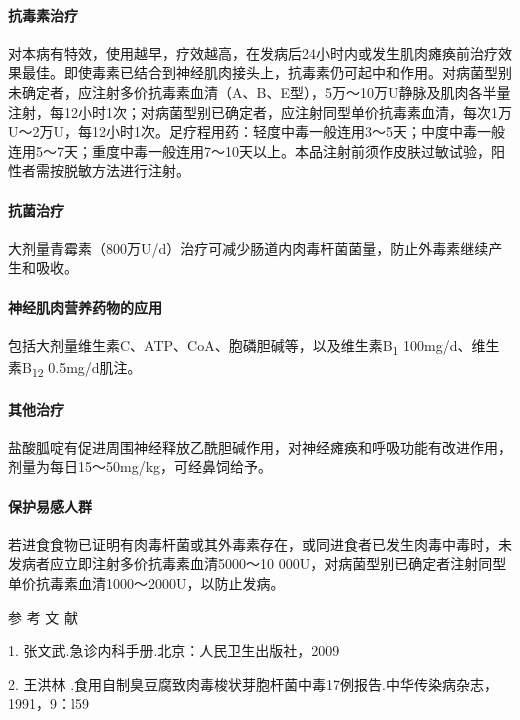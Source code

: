 \paragraph{抗毒素治疗}

对本病有特效，使用越早，疗效越高，在发病后24小时内或发生肌肉瘫痪前治疗效果最佳。即使毒素已结合到神经肌肉接头上，抗毒素仍可起中和作用。对病菌型别未确定者，应注射多价抗毒素血清（A、B、E型），5万～10万U静脉及肌肉各半量注射，每12小时1次；对病菌型别已确定者，应注射同型单价抗毒素血清，每次1万U～2万U，每12小时1次。足疗程用药：轻度中毒一般连用3～5天；中度中毒一般连用5～7天；重度中毒一般连用7～10天以上。本品注射前须作皮肤过敏试验，阳性者需按脱敏方法进行注射。

\paragraph{抗菌治疗}

大剂量青霉素（800万U/d）治疗可减少肠道内肉毒杆菌菌量，防止外毒素继续产生和吸收。

\paragraph{神经肌肉营养药物的应用}

包括大剂量维生素C、ATP、CoA、胞磷胆碱等，以及维生素B\textsubscript{1}
100mg/d、维生素B\textsubscript{12} 0.5mg/d肌注。

\paragraph{其他治疗}

盐酸胍啶有促进周围神经释放乙酰胆碱作用，对神经瘫痪和呼吸功能有改进作用，剂量为每日15～50mg/kg，可经鼻饲给予。

\paragraph{保护易感人群}

若进食食物已证明有肉毒杆菌或其外毒素存在，或同进食者已发生肉毒中毒时，未发病者应立即注射多价抗毒素血清5000～10
000U，对病菌型别已确定者注射同型单价抗毒素血清1000～2000U，以防止发病。

\protect\hypertarget{text00185.html}{}{}

\hypertarget{text00185.htmlux5cux23CHP5-10-4}{}
参 考 文 献

1. 张文武.急诊内科手册.北京：人民卫生出版社，2009

2. 王洪林
.食用自制臭豆腐致肉毒梭状芽胞杆菌中毒17例报告.中华传染病杂志，1991，9：l59

